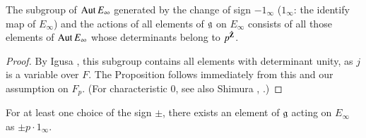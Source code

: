 \setcounter{subprop}{1}
\begin{subprop}[Igusa]\label{art6-subprop1.1.2}
The subgroup of $\operatorname{Aut} E_\infty$ generated by the change of sign $-1_\infty$ ($1_\infty$: the identify map of $E_\infty$) and the actions of all elements of $\mathfrak{g}$ on $E_\infty$ consists of all those elements of $\operatorname{Aut} E_\infty$ whose determinants belong to $p^{\hat{\mathbf{Z}}}$.
\end{subprop}

\begin{proof}
By Igusa \cite{art6-key5}, this subgroup contains all elements with determinant unity, as $j$ is a variable over $F$. The Proposition follows immediately from this and our assumption on $F_p$. (For characteristic 0, see also Shimura \cite{art6-17}, \cite{art6-18}.)
\end{proof}

\begin{coro*}
For at least one choice of the sign $\pm$, there exists an element of $\mathfrak{g}$ acting on $E_\infty$ as $\pm p \cdot 1_\infty$.
\end{coro*}

